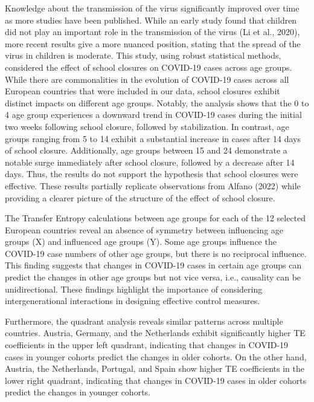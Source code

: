 \documentclass[unnumsec,webpdf,contemporary,large]{oup-authoring-template}%
\theoremstyle{thmstyleone}%
\theoremstyle{thmstyletwo}%
\theoremstyle{thmstylethree}%
\begin{document}
Knowledge about the transmission of the virus significantly improved over time as more studies have been published. While an early study found that children did not play an important role in the transmission of the virus (Li et al., 2020), more recent results give a more nuanced position, stating that the spread of the virus in children is moderate. This study, using robust statistical methods, considered the effect of school closures on COVID-19 cases across age groups. While there are commonalities in the evolution of COVID-19 cases across all European countries that were included in our data, school closures exhibit distinct impacts on different age groups. Notably, the analysis shows that the 0 to 4 age group experiences a downward trend in COVID-19 cases during the initial two weeks following school closure, followed by stabilization. In contrast, age groups ranging from 5 to 14 exhibit a substantial increase in cases after 14 days of school closure. Additionally, age groups between 15 and 24 demonstrate a notable surge immediately after school closure, followed by a decrease after 14 days. Thus, the results do not support the hypothesis that school closures were effective. These results partially replicate observations from Alfano (2022) while providing a clearer picture of the structure of the effect of school closure.

The Transfer Entropy calculations between age groups for each of the 12 selected European countries reveal an absence of symmetry between influencing age groups (X) and influenced age groups (Y). Some age groups influence the COVID-19 case numbers of other age groups, but there is no reciprocal influence. This finding suggests that changes in COVID-19 cases in certain age groups can predict the changes in other age groups but not vice versa, i.e., causality can be unidirectional. These findings highlight the importance of considering intergenerational interactions in designing effective control measures.

Furthermore, the quadrant analysis reveals similar patterns across multiple countries. Austria, Germany, and the Netherlands exhibit significantly higher TE coefficients in the upper left quadrant, indicating that changes in COVID-19 cases in younger cohorts predict the changes in older cohorts. On the other hand, Austria, the Netherlands, Portugal, and Spain show higher TE coefficients in the lower right quadrant, indicating that changes in COVID-19 cases in older cohorts predict the changes in younger cohorts.
\end{document}
